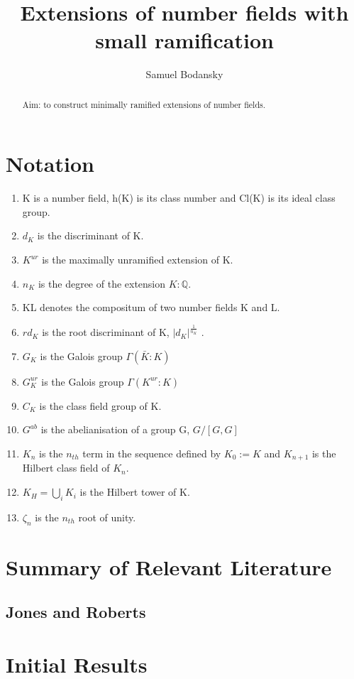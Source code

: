 \documentclass[preprint,12pt,reqno]{elsarticle}
\begin{document}
\begin{frontmatter}
\title{Extensions of number fields with small ramification}
\author{Samuel Bodansky}
\address{Oxford,UK}
\begin{abstract}
Aim: to construct minimally ramified extensions of number fields.
\end{abstract}
\end{frontmatter}
\section{Notation}
\begin{enumerate}
    \item K is a number field, h(K) is its class number and Cl(K) is its ideal class group.
    \item $d_K$ is the discriminant of K.
    \item $K^{ur}$ is the maximally unramified extension of K.
    \item $n_K$ is the degree of the extension $K:\mathbb{Q}$.
    \item KL denotes the compositum of two number fields K and L.
    \item $rd_K$ is the root discriminant of K, $|d_K|^\frac{1}{n_K}$ .
    \item $G_K$ is the Galois group $\Gamma(\bar{K}:K)$
    \item $G_K^{ur}$ is the Galois group $\Gamma(K^{ur}:K)$
    \item $C_K$ is the class field group of K. 
    \item $G^{ab}$ is the abelianisation of a group G, $G/[G,G]$
    \item $K_n$ is the $n_{th}$ term in the sequence defined by $K_0:=K$ and $K_{n+1}$ is the Hilbert class field of $K_n$.
    \item $K_H=\bigcup_{i}K_{i}$ is the Hilbert tower of K.  
    \item $\zeta_n$ is the $n_{th}$ root of unity. 
\end{enumerate}
\section{Summary of Relevant Literature}
\subsection{Jones and Roberts}

\section{Initial Results}
\end{document}
